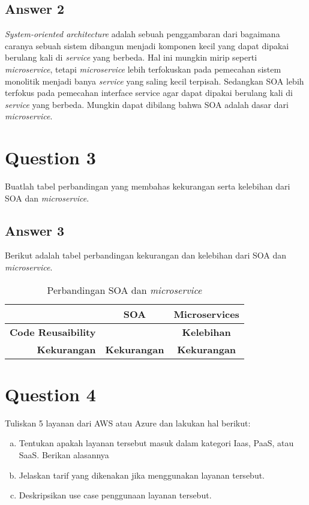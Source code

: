 \documentclass[
	11pt, %
	indonesian
]{assignment}
\begin{document}
\subsection*{Answer 2}

\textit{System-oriented architecture} adalah sebuah penggambaran dari bagaimana caranya sebuah sistem dibangun menjadi komponen kecil yang dapat dipakai berulang kali di \textit{service} yang berbeda. Hal ini mungkin mirip seperti \textit{microservice}, tetapi \textit{microservice} lebih terfokuskan pada pemecahan sistem monolitik menjadi banya \textit{service} yang saling kecil terpisah. Sedangkan SOA lebih terfokus pada pemecahan interface service agar dapat dipakai berulang kali di \textit{service} yang berbeda. Mungkin dapat dibilang bahwa SOA adalah dasar dari \textit{microservice}.

\section*{Question 3}
\begin{problem}
Buatlah tabel perbandingan yang membahas kekurangan serta kelebihan dari SOA dan \textit{microservice}.
\end{problem}

\subsection*{Answer 3}

Berikut adalah tabel perbandingan kekurangan dan kelebihan dari SOA dan \textit{microservice}.

\begin{table}[h]
	\centering
	\begin{tabular}{r c c}
		\toprule
		                           & \textbf{SOA}        & \textbf{Microservices} \\
		\midrule
		\textbf{Code Reusaibility} &                     & \textbf{Kelebihan}     \\
		\textbf{Kekurangan}        & \textbf{Kekurangan} & \textbf{Kekurangan}    \\
		\bottomrule
	\end{tabular}
	\caption{Perbandingan SOA dan \textit{microservice}}
\end{table}


\section*{Question 4}
\begin{problem}
Tuliskan 5 layanan dari AWS atau Azure dan lakukan hal berikut:
\begin{enumerate}[a.]
	\item Tentukan apakah layanan tersebut masuk dalam kategori Iaas, PaaS, atau SaaS. Berikan alasannya
	\item Jelaskan tarif yang dikenakan jika menggunakan layanan tersebut.
	\item Deskripsikan use case penggunaan layanan tersebut.
\end{enumerate}
\end{problem}
\end{document}
